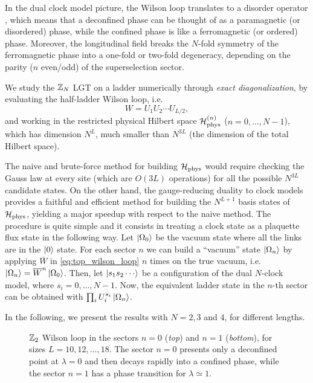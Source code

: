 In the dual clock model picture, the Wilson loop translates to a disorder operator \cite{fradkin1978order}, which means that a deconfined phase can be thought of as a paramagnetic (or disordered) phase, while the confined phase is like a ferromagnetic (or ordered) phase.
Moreover, the longitudinal field breaks the $N$-fold symmetry of the ferromagnetic phase into a one-fold or two-fold degeneracy, depending on the parity ($n$ even/odd) of the superselection sector.

We study the $\mathbb{Z}_N$ LGT on a ladder numerically through \emph{exact diagonalization}, by evaluating the half-ladder Wilson loop, i.e.~
\begin{equation}
    W = U_1 U_2 \cdots U_{L/2},
\end{equation}
and working in the restricted physical Hilbert space $\mathcal{H}_{\text{phys}}^{(n)}$ ($n=0,\dots,N-1$), which has dimension $N^L$, much smaller than $N^{3L}$ (the dimension of the total Hilbert space).

The naive and brute-force method for building $\mathcal{H}_{\text{phys}}$ would require checking the Gauss law at every site (which are $O(3L)$ operations) for all the possible $N^{3L}$ candidate states.
On the other hand, the gauge-reducing duality to clock models provides a faithful and efficient method for building the $N^{L+1}$ basis states of $\mathcal{H}_{\text{phys}}$, yielding a major speedup with respect to the naive method.
The procedure is quite simple and it consists in treating a clock state as a plaquette flux state in the following way.
Let $\ket{\Omega_0}$ be the vacuum state where all the links are in the $\ket{0}$ state.
For each sector $n$ we can build a ``vacuum'' state $\ket{\Omega_n}$ by applying $\overline{W}$ in \eqref{eq:top_wilson_loop} $n$ times on the true vacuum, i.e.~$\ket{\Omega_n} = \overline{W}^{n} \ket{\Omega_0}$.
Then, let $\ket{s_1 s_2 \cdots}$ be a configuration of the dual $N$-clock model, where $s_i = 0, \dots, N-1$.
Now, the equivalent ladder state in the $n$-th sector can be obtained with $\prod_{i} U_i^{s_i} \ket{\Omega_n}$.

In the following, we present the results with $N=2,3$ and $4$, for different lengths.



\begin{figure}[t]
    \centering
    
    \vspace*{-10pt}
    \caption{$\mathbb{Z}_2$ Wilson loop in the sectors $n=0$ (\emph{top}) and $n=1$ (\emph{bottom}), for sizes $L=10,12, \dots,18$.
    The sector $n=0$ presents only a deconfined point at $\lambda=0$ and then decays rapidly into a confined phase, while the sector $n=1$ has a phase transition for $\lambda \simeq 1$.
    }
    \label{fig:z2_wilson}
\end{figure}

